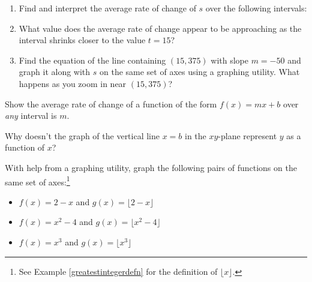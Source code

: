 \begin{exenum}
\begin{enumerate}

\item  Find and interpret the average rate of change of $s$ over the following intervals:

\begin{shortenumerate}

\item $[14.9, 15]$

\item  $[15, 15.1]$

\item  $[14.99, 15]$

\item  $[15, 15.01]$

\end{shortenumerate}

\item  What value does the average rate of change appear to be approaching as the interval shrinks closer to the value $t=15$?

\item  Find the equation of the line containing $(15, 375)$ with slope $m = -50$ and graph it along with $s$ on the same set of axes using a graphing utility.  What happens as you zoom in near $(15, 375)$?

\end{enumerate}

\item  \label{lineshaveconstantratesofchange} Show the average rate of change of a function of the form $f(x) = mx+b$ over \textit{any} interval is $m$.

\item Why doesn't the graph of the vertical line $x = b$ in the $xy$-plane represent $y$ as a function of $x$?\label{whynoverticallineshere}

\item With help from a graphing utility, graph the following pairs of functions on the same set of axes:\footnote{See Example \ref{greatestintegerdefn} for the definition of $\lfloor x \rfloor$.}

\begin{itemize}

\item  $f(x) = 2-x$ and $g(x) = \lfloor 2-x \rfloor$

\item  $f(x) = x^2-4$ and $g(x) = \lfloor x^2 -4\rfloor$

\item  $f(x) = x^3$ and $g(x) = \lfloor x^3 \rfloor$


\end{itemize}
\end{exenum}
